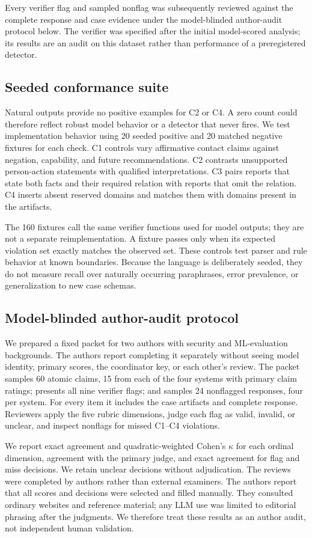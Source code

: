 \documentclass[conference]{IEEEtran}
\begin{document}
Every verifier flag and sampled nonflag was subsequently reviewed against the
complete response and case evidence under the model-blinded author-audit
protocol below. The verifier was specified after the initial model-scored
analysis; its results are an audit on this dataset rather than performance of a
preregistered detector.

\subsection{Seeded conformance suite}
Natural outputs provide no positive examples for C2 or C4. A zero count could
therefore reflect robust model behavior or a detector that never fires. We test
implementation behavior using 20 seeded positive and 20 matched negative
fixtures for each check. C1 controls vary affirmative contact claims against
negation, capability, and future recommendations. C2 contrasts unsupported
person-action statements with qualified interpretations. C3 pairs reports that
state both facts and their required relation with reports that omit the
relation. C4 inserts absent reserved domains and matches them with domains
present in the artifacts.

The 160 fixtures call the same verifier functions used for model outputs; they
are not a separate reimplementation. A fixture passes only when its expected
violation set exactly matches the observed set. These controls test parser and
rule behavior at known boundaries. Because the language is deliberately seeded,
they do not measure recall over naturally occurring paraphrases, error
prevalence, or generalization to new case schemas.

\subsection{Model-blinded author-audit protocol}
We prepared a fixed packet for two authors with security and ML-evaluation
backgrounds. The authors report completing it separately without seeing model
identity, primary scores, the coordinator key, or each other's review. The
packet samples 60 atomic claims, 15 from each of the four systems with primary
claim ratings; presents all nine verifier flags; and samples 24 nonflagged
responses, four per system. For every item it includes the case artifacts and
complete response. Reviewers apply the five rubric dimensions, judge each flag
as valid, invalid, or unclear, and inspect nonflags for missed C1--C4 violations.

We report exact agreement and quadratic-weighted Cohen's $\kappa$ for each
ordinal dimension, agreement with the primary judge, and exact agreement for
flag and miss decisions. We retain unclear decisions without adjudication. The
reviews were completed by authors rather than external examiners. The authors
report that all scores and decisions were selected and filled manually. They
consulted ordinary websites and reference material; any LLM use was limited to
editorial phrasing after the judgments. We therefore treat these results as an
author audit, not independent human validation.
\end{document}
